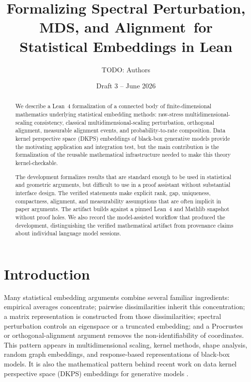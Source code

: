 \documentclass[11pt]{article}
\title{Formalizing Spectral Perturbation, MDS, and Alignment\
for Statistical Embeddings in Lean}
\author{TODO: Authors}
\date{Draft 3 -- June 2026}
\newcommand{\Lean}{Lean~4\xspace}
\newcommand{\Mathlib}{Mathlib\xspace}
\begin{document}
\maketitle

\begin{abstract}
We describe a \Lean formalization of a connected body of finite-dimensional
mathematics underlying statistical embedding methods: raw-stress
multidimensional-scaling consistency, classical multidimensional-scaling
perturbation, orthogonal alignment, measurable alignment events, and
probability-to-rate composition.  Data kernel perspective space (DKPS)
embeddings of black-box generative models provide the motivating application
and integration test, but the main contribution is the formalization of the
reusable mathematical infrastructure needed to make this theory kernel-checkable.

The development formalizes results that are standard enough to be used in
statistical and geometric arguments, but difficult to use in a proof assistant
without substantial interface design.  The verified statements make explicit
rank, gap, uniqueness, compactness, alignment, and measurability assumptions
that are often implicit in paper arguments.  The artifact builds against a
pinned \Lean and \Mathlib snapshot without proof holes.  We also record the
model-assisted workflow that produced the development, distinguishing the
verified mathematical artifact from provenance claims about individual language
model sessions.
\end{abstract}

\section{Introduction}

Many statistical embedding arguments combine several familiar ingredients:
empirical averages concentrate; pairwise dissimilarities inherit this
concentration; a matrix representation is constructed from those dissimilarities;
spectral perturbation controls an eigenspace or a truncated embedding; and a
Procrustes or orthogonal-alignment argument removes the non-identifiability of
coordinates.  This pattern appears in multidimensional scaling, kernel methods,
shape analysis, random graph embeddings, and response-based representations of
black-box models.  It is also the mathematical pattern behind recent work on data
kernel perspective space (DKPS) embeddings for generative models
\cite{duderstadt2023datakernels,helm2024tracking,acharyya2024consistent,acharyya2025concentration,helm2025inference,helm2026query}.
\end{document}
